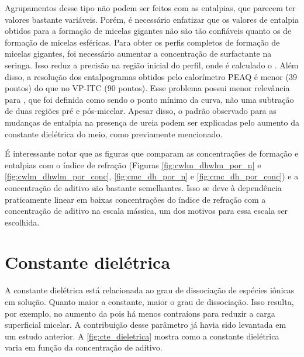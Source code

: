 		Agrupamentos desse tipo não podem ser feitos com as entalpias, que parecem ter valores bastante variáveis. Porém, é necessário enfatizar que os valores de entalpia obtidos para a formação de micelas gigantes não são tão confiáveis quanto os de formação de micelas esféricas. Para obter os perfis completos de formação de micelas gigantes, foi necessário aumentar a concentração de surfactante na seringa. Isso reduz a precisão na região inicial do perfil, onde é calculado o \DHwlm. Além disso, a resolução dos entalpogramas obtidos pelo calorímetro PEAQ é menor (39 pontos) do que no VP-ITC (90 pontos). Esse problema possui menor relevância para \cwlm{}, que foi definida como sendo o ponto mínimo da curva, não uma subtração de duas regiões pré e pós-micelar.  Apesar disso, o padrão observado para as mudanças de entalpia na presença de ureia podem ser explicadas pelo aumento da constante dielétrica do meio, como previamente mencionado.
	
		É interessante notar que as figuras que comparam as concentrações de formação e entalpias com o índice de refração (Figuras \ref{fig:cwlm_dhwlm_por_n} e \ref{fig:cwlm_dhwlm_por_conc}, \ref{fig:cmc_dh_por_n} e \ref{fig:cmc_dh_por_conc}) e a concentração de aditivo são bastante semelhantes. Isso se deve à dependência praticamente linear em baixas concentrações do índice de refração com a concentração de aditivo na escala mássica, um dos motivos para essa escala ser escolhida.
		
		\FloatBarrier
		
		\section{Constante dielétrica} 
		
		A constante dielétrica está relacionada ao grau de dissociação de espécies iônicas em solução. Quanto maior a constante, maior o grau de dissociação. Isso resulta, por exemplo, no aumento da \cmc{} pois há menos contraíons para reduzir a carga superficial micelar. A contribuição desse parâmetro já havia sido levantada em um estudo anterior.\cite{Abdel-Rahem2012}
		A \autoref{fig:cte_dieletrica} mostra como a constante dielétrica varia em função da concentração de aditivo.
		
